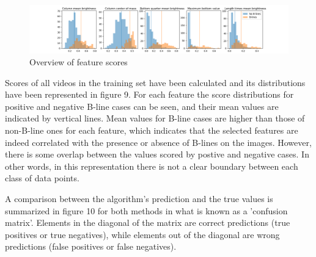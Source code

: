 \documentclass[11pt]{article} %
\begin{document}
	
	\begin{figure}
	\centering
		\includegraphics[width=\textwidth]{figuras/score_overview.png}
	\caption{Overview of feature scores}
	\end{figure}


	Scores of all videos in the training set have been calculated and its distributions have been represented in figure 9. For each feature the score distributions for positive and negative B-line cases can be seen, and their mean values are indicated by vertical lines. Mean values for B-line cases are higher than those of non-B-line ones for each feature, which indicates that the selected features are indeed correlated with the presence or absence of B-lines on the images. However, there is some overlap between the values scored by postive and negative cases. In other words, in this representation there is not a clear boundary between each class of data points. 
	
	A comparison between the algorithm's prediction and the true values is summarized in figure 10 for both methods in what is known as a 'confusion matrix'. Elements in the diagonal of the matrix are correct predictions (true positives or true negatives), while elements out of the diagonal are wrong predictions (false positives or false negatives). 
	
\end{document}
